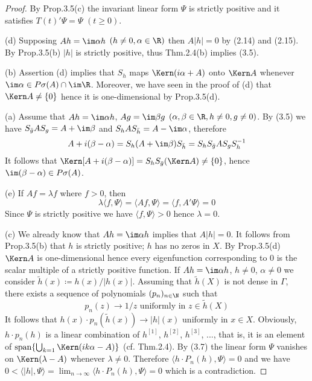 \begin{proof}
	By Prop.3.5(c) the invariant linear form $\Psi$ is strictly positive and it satisfies $T(t)'\Psi = \Psi$ $(t \geq 0)$.
	
	(d) Supposing $Ah = \im\alpha h$ $(h \neq 0, \alpha \in \R)$ then $A|h| = 0$ by (2.14) and (2.15).
	By Prop.3.5(b) $|h|$ is strictly positive, thus Thm.2.4(b) implies (3.5).
	
	(b) Assertion (d) implies that $S_{h}$ maps $\Kern(i\alpha + A)$ onto $\Kern A$ whenever $\im \alpha \in P\sigma(A)\cap \im\R$.
	Moreover, we have seen in the proof of (d) that $\Kern A \neq \{0\}$ hence it is one-dimensional by Prop.3.5(d).
	
	(a) Assume that $Ah = \im\alpha h$, $Ag = \im\beta g$ $(\alpha,\beta \in \R, h \neq 0, g \neq 0)$.
	By (3.5) we have $S_{\bar{g}}A S_{g} = A + \im\beta$ and $S_{h}A S_{\bar{h}} = A - \im\alpha$, therefore
	\begin{equation}\label{eq:b3-3.6}
	A + i(\beta - \alpha) = S_{h}(A + \im\beta)S_{\bar{h}} = S_{h}S_{\bar{g}}A S_{g}S_{h}^{-1}
	\end{equation}
	It follows that $\Kern[A + i(\beta - \alpha)] = S_{h}S_{\bar{g}}(\Kern A) \neq \{0\}$, hence $\im (\beta - \alpha) \in P\sigma(A)$.
	
	(e) If $Af = \lambda f$ where $f > 0$, then
	\begin{equation}\label{eq:b3-3.7}
	\lambda\langle f,\Psi\rangle = \langle Af,\Psi\rangle = \langle f,A'\Psi\rangle = 0
	\end{equation}
	Since $\Psi$ is strictly positive we have $\langle f,\Psi\rangle > 0$ hence $\lambda = 0$.
	
	(c) We already know that $Ah = \im\alpha h$ implies that $A|h| = 0$.
	It follows from Prop.3.5(b) that $h$ is strictly positive; \ie $h$ has no zeros in $X$.
	By Prop.3.5(d) $\Kern A$ is one-dimensional hence every
%
%
%
eigenfunction corresponding to $0$ is the scalar multiple of a strictly positive function.
If $Ah = \im\alpha h$, $h \neq 0$, $\alpha \neq 0$ we consider $\tilde{h}(x) \coloneq h(x)/|h(x)|$.
Assuming that $\tilde{h}(X)$ is not dense in $\Gamma$, there exists a sequence of polynomials $(p_{n})_{n\in\N}$ such that
\begin{equation}\label{eq:b3-3.8}
p_{n}(z) \to 1/z \text{ uniformly in } z \in \tilde{h}(X)
\end{equation}
It follows that $h(x)\cdot p_{n}(\tilde{h}(x)) \to |h|(x)$ uniformly in $x \in X$.
Obviously, $h\cdot p_{n}(h)$ is a linear combination of $h^{[1]}$, $h^{[2]}$, $h^{[3]}$, ..., that is, it is an element of $\text{span}\{\bigcup_{k=1}\Kern(ik\alpha - A)\}$ (cf. Thm.2.4).
By (3.7) the linear form $\Psi$ vanishes on $\Kern(\lambda - A)$ whenever $\lambda \neq 0$.
Therefore $\langle h\cdot P_{n}(h),\Psi\rangle = 0$ and we have $0 < \langle|h|,\Psi\rangle = \lim_{n\to\infty}\langle h\cdot P_{n}(h),\Psi\rangle = 0$ which is a contradiction.
\end{proof}

